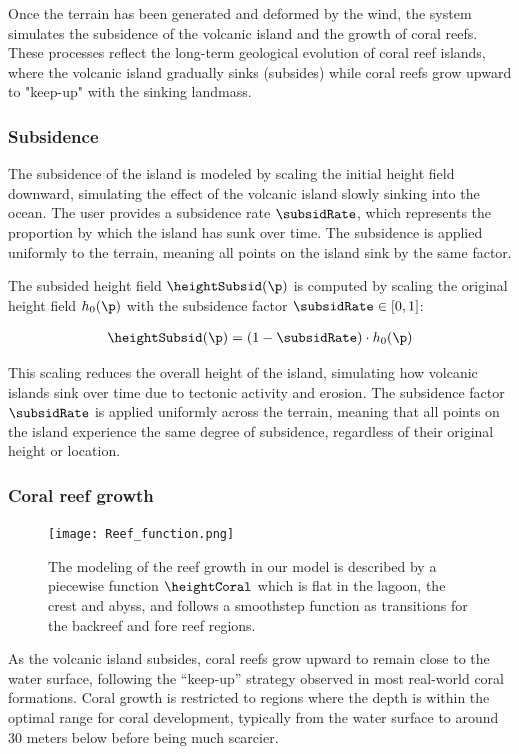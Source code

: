 Once the terrain has been generated and deformed by the wind, the system simulates the subsidence of the volcanic island and the growth of coral reefs. These processes reflect the long-term geological evolution of coral reef islands, where the volcanic island gradually sinks (subsides) while coral reefs grow upward to "keep-up" with the sinking landmass.

\subsubsection{Subsidence}

The subsidence of the island is modeled by scaling the initial height field downward, simulating the effect of the volcanic island slowly sinking into the ocean. The user provides a subsidence rate $\subsidRate$, which represents the proportion by which the island has sunk over time. The subsidence is applied uniformly to the terrain, meaning all points on the island sink by the same factor.

The subsided height field $\heightSubsid(\p)$ is computed by scaling the original height field $h_0(\p)$ with the subsidence factor $\subsidRate \in [0, 1]$:

\begin{align}
    \heightSubsid(\p) = (1 - \subsidRate) \cdot h_0(\p)
\end{align}

This scaling reduces the overall height of the island, simulating how volcanic islands sink over time due to tectonic activity and erosion. The subsidence factor $\subsidRate$ is applied uniformly across the terrain, meaning that all points on the island experience the same degree of subsidence, regardless of their original height or location.

\subsubsection{Coral reef growth}

\begin{figure}[H]
    \texttt{[image: Reef\_function.png]}
    \caption{The modeling of the reef growth in our model is described by a piecewise function $\heightCoral$ which is flat in the lagoon, the crest and abyss, and follows a smoothstep function as transitions for the backreef and fore reef regions. }
    \label{fig:coral-island-reef-function}
\end{figure}

As the volcanic island subsides, coral reefs grow upward to remain close to the water surface, following the “keep-up” strategy observed in most real-world coral formations. Coral growth is restricted to regions where the depth is within the optimal range for coral development, typically from the water surface to around 30 meters below before being much scarcier.

